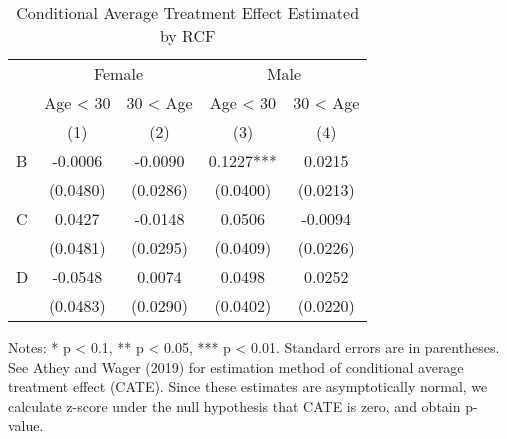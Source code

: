 \documentclass[
  11pt,
  a4paper
]{article}
\begin{document}
\begin{table}[H]

\caption{\label{tab:rcf-int-cate}Conditional Average Treatment Effect Estimated by RCF}
\centering
\fontsize{9}{11}\selectfont
\begin{threeparttable}
\begin{tabular}[t]{lcccc}
\toprule
\multicolumn{1}{c}{ } & \multicolumn{2}{c}{Female} & \multicolumn{2}{c}{Male} \\
\cmidrule(l{3pt}r{3pt}){2-3} \cmidrule(l{3pt}r{3pt}){4-5}
\multicolumn{1}{c}{ } & \multicolumn{1}{c}{Age < 30} & \multicolumn{1}{c}{30 < Age} & \multicolumn{1}{c}{Age < 30} & \multicolumn{1}{c}{30 < Age} \\
\cmidrule(l{3pt}r{3pt}){2-2} \cmidrule(l{3pt}r{3pt}){3-3} \cmidrule(l{3pt}r{3pt}){4-4} \cmidrule(l{3pt}r{3pt}){5-5}
 & (1) & (2) & (3) & (4)\\
\midrule
B & -0.0006 & -0.0090 & 0.1227*** & 0.0215\\
 & (0.0480) & (0.0286) & (0.0400) & (0.0213)\\
C & 0.0427 & -0.0148 & 0.0506 & -0.0094\\
 & (0.0481) & (0.0295) & (0.0409) & (0.0226)\\
D & -0.0548 & 0.0074 & 0.0498 & 0.0252\\
 & (0.0483) & (0.0290) & (0.0402) & (0.0220)\\
\bottomrule
\end{tabular}
\begin{tablenotes}
\item Notes: * p < 0.1, ** p < 0.05, *** p < 0.01. Standard errors are in parentheses. See Athey and Wager (2019) for estimation method of conditional average treatment effect (CATE). Since these estimates are asymptotically normal, we calculate z-score under the null hypothesis that CATE is zero, and obtain p-value. 
\end{tablenotes}
\end{threeparttable}
\end{table}
\end{document}
